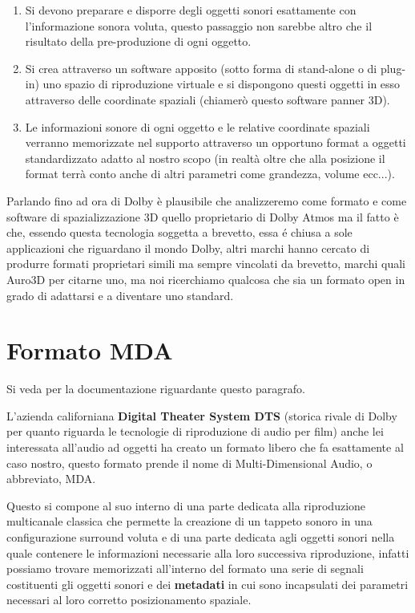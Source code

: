 \documentclass[12pt,a4paper]{report}
\begin{document}
 \begin{enumerate}
 
\item Si devono preparare e disporre degli oggetti sonori esattamente con l'informazione sonora voluta, questo passaggio non sarebbe altro che il risultato della pre-produzione di ogni oggetto.
\item Si crea attraverso un software apposito (sotto forma di stand-alone o di plug-in) uno spazio di riproduzione virtuale e si dispongono questi oggetti in esso attraverso delle coordinate spaziali (chiamerò questo software panner 3D).
\item Le informazioni sonore di ogni oggetto e le relative coordinate spaziali verranno memorizzate nel supporto attraverso un opportuno format a oggetti standardizzato adatto al nostro scopo (in realtà oltre che alla posizione il format terrà conto anche di altri parametri come grandezza, volume ecc...).
 \end{enumerate}

Parlando fino ad ora di Dolby è plausibile che analizzeremo come formato e come software di spazializzazione 3D quello proprietario di Dolby Atmos ma il fatto è che, essendo questa tecnologia soggetta a brevetto, essa é chiusa a sole applicazioni che riguardano il mondo Dolby, altri marchi hanno cercato di produrre formati proprietari simili ma sempre vincolati da brevetto, marchi quali Auro3D per citarne uno, ma noi ricerchiamo qualcosa che sia un formato open in grado di adattarsi e a diventare uno standard. 

\section{Formato MDA}

Si veda \cite{mda} per la documentazione riguardante questo paragrafo.

L'azienda californiana \textbf{Digital Theater System DTS} (storica rivale di Dolby per quanto riguarda le tecnologie di riproduzione di audio per film) anche lei interessata all'audio ad oggetti ha creato un formato libero che fa esattamente al caso nostro, questo formato prende il nome di Multi-Dimensional Audio, o abbreviato, MDA.

Questo si compone al suo interno di una parte dedicata alla riproduzione multicanale classica che permette la creazione di un tappeto sonoro in una configurazione surround voluta e di una parte dedicata agli oggetti sonori nella quale contenere le informazioni necessarie alla loro successiva riproduzione, infatti possiamo trovare memorizzati all'interno del formato una serie di segnali costituenti gli oggetti sonori e dei \textbf{metadati} in cui sono incapsulati dei parametri necessari al loro corretto posizionamento spaziale.
\end{document}
